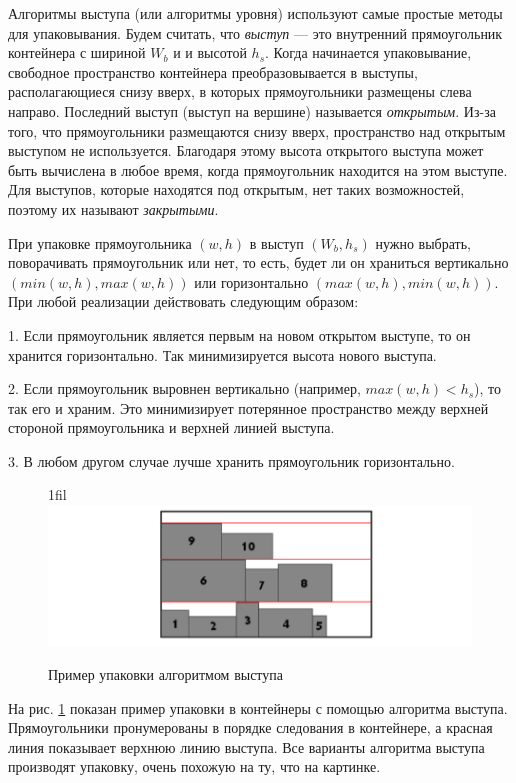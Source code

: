 \documentclass[a4paper,12pt]{report}
\makeatletter
\theoremstyle{remark}
\newcommand*{\centerfloat}{%
  \parindent \z@
  \leftskip \z@ \@plus 1fil \@minus \textwidth
  \rightskip\leftskip
  \parfillskip \z@skip}
\makeatother
\begin{document}
Алгоритмы выступа\citep{Jylanki} (или алгоритмы уровня) используют самые простые методы для упаковывания. Будем считать, что \textit{выступ} — это внутренний прямоугольник контейнера с шириной $W_b$ и и высотой $h_s$. Когда начинается упаковывание, свободное пространство контейнера преобразовывается в выступы, располагающиеся снизу вверх, в которых прямоугольники размещены слева направо. Последний выступ (выступ на вершине) называется \textit{открытым}. Из-за того, что прямоугольники размещаются снизу вверх, пространство над открытым выступом не используется. Благодаря этому высота открытого выступа может быть вычислена в любое время, когда прямоугольник находится на этом выступе. Для выступов, которые находятся под открытым, нет таких возможностей, поэтому их называют \textit{закрытыми}.

При упаковке прямоугольника $(w, h)$ в выступ $(W_b, h_s)$ нужно выбрать, поворачивать прямоугольник или нет, то есть, будет ли он храниться вертикально  $(min(w, h), max(w, h))$ или горизонтально $(max(w, h), min(w, h))$. При любой реализации действовать следующим образом:

1. Если прямоугольник является первым на новом открытом выступе, то он хранится горизонтально. Так минимизируется высота нового выступа.

2. Если прямоугольник выровнен вертикально (например, $max(w, h) < h_s$), то так его и храним. Это минимизирует потерянное пространство между верхней стороной прямоугольника и верхней линией выступа.

3. В любом другом случае лучше хранить прямоугольник горизонтально.

\begin{figure}
    \centerfloat
    \includegraphics[width=1\textwidth]{packing/1.png}
    \caption{Пример упаковки алгоритмом выступа}
    \label{fig:shelf}
\end{figure}

На рис. \ref{fig:shelf} показан пример упаковки в контейнеры с помощью алгоритма выступа. Прямоугольники пронумерованы в порядке следования в контейнере, а красная линия показывает верхнюю линию выступа. Все варианты алгоритма выступа производят упаковку, очень похожую на ту, что на картинке.
\end{document}
